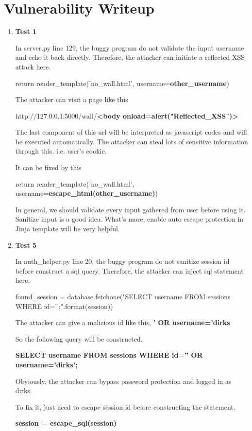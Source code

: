 \documentclass[11pt]{article}
\newenvironment{qparts}{\begin{enumerate}[{(}a{)}]}{\end{enumerate}}
\begin{document}
\newpage
\section{Vulnerability Writeup}
\begin{qparts}
	\item \textbf{Test 1}
	
	In server.py line 129, the buggy program do not validate the input username and echo it back directly. Therefore, the attacker can initiate a reflected XSS attack here.
	
	return render\_template('no\_wall.html', username=\textbf{other\_username})
	
	The attacker can visit a page like this
	
	http://127.0.0.1:5000/wall/\textbf{\textless body onload=alert("Reflected\_XSS")\textgreater}
	
	The last component of this url will be interpreted as javascript codes and will be executed automatically. The attacker can steal lots of sensitive information through this. i.e. user's cookie.
	
	It can be fixed by this
	
	return render\_template('no\_wall.html', username=\textbf{escape\_html(other\_username)})
	
	In general, we should validate every input gathered from user before using it. Sanitize input is a good idea. What's more, enable auto escape protection in Jinja template will be very helpful.
	
	\item \textbf{Test 5}
	
	In auth\_helper.py line 20, the buggy program do not sanitize session id before construct a sql query. Therefore, the attacker can inject sql statement here.
	
	found\_session = database.fetchone("SELECT username FROM sessions WHERE id='{}';".format(session))
	
	The attacker can give a malicious id like this, \textbf{' OR username='dirks}
	
	So the following query will be constructed. 
	
	\textbf{SELECT username FROM sessions WHERE id='' OR username='dirks';}
	
	Obviously, the attacker can bypass password protection and logged in as dirks.
	
	To fix it, just need to escape session id before constructing the statement.
	
	\textbf{session = escape\_sql(session)}
	

\end{qparts}
\end{document}
